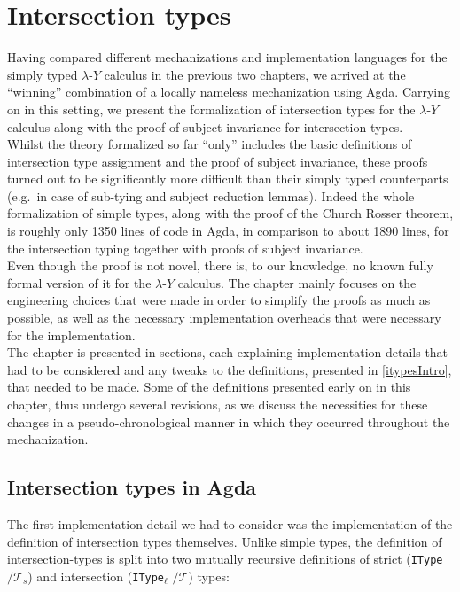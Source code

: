 \documentclass[a4paper, 12pt, twoside]{style/ociamthesis}
\theoremstyle{plain}
\theoremstyle{definition}
\theoremstyle{remark}
\newcommand{\lamy}{\lambda\text{-}Y}
\begin{document}
\newpage

\chapter{Intersection types}\label{intersection-types-1}

\label{chap:itypes}

Having compared different mechanizations and implementation languages
for the simply typed \(\lamy\) calculus in the previous two chapters, we
arrived at the ``winning'' combination of a locally nameless
mechanization using Agda. Carrying on in this setting, we present the
formalization of intersection types for the \(\lamy\) calculus along
with the proof of subject invariance for intersection types.\\
Whilst the theory formalized so far ``only'' includes the basic
definitions of intersection type assignment and the proof of subject
invariance, these proofs turned out to be significantly more difficult
than their simply typed counterparts (e.g.~in case of sub-tying and
subject reduction lemmas). Indeed the whole formalization of simple
types, along with the proof of the Church Rosser theorem, is roughly
only 1350 lines of code in Agda, in comparison to about 1890 lines, for
the intersection typing together with proofs of subject invariance.\\
Even though the proof is not novel, there is, to our knowledge, no known
fully formal version of it for the \(\lamy\) calculus. The chapter
mainly focuses on the engineering choices that were made in order to
simplify the proofs as much as possible, as well as the necessary
implementation overheads that were necessary for the implementation.\\
The chapter is presented in sections, each explaining implementation
details that had to be considered and any tweaks to the definitions,
presented in \cref{itypesIntro}, that needed to be made. Some of the
definitions presented early on in this chapter, thus undergo several
revisions, as we discuss the necessities for these changes in a
pseudo-chronological manner in which they occurred throughout the
mechanization.

\section{Intersection types in Agda}\label{intersection-types-in-agda}

\label{itypesAgda}

The first implementation detail we had to consider was the
implementation of the definition of intersection types themselves.
Unlike simple types, the definition of intersection-types is split into
two mutually recursive definitions of strict (\texttt{IType}
\(/\mathcal{T}_s\)) and intersection (\texttt{IType}\(_\ell\)
\(/\mathcal{T}\)) types:
\end{document}
